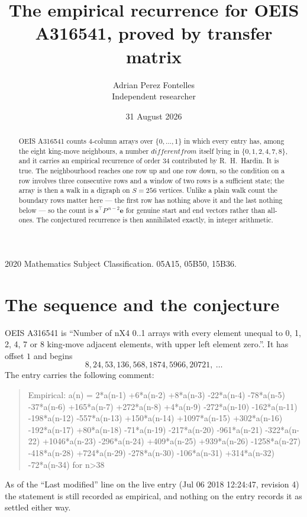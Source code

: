 \documentclass[11pt,a4paper]{article}
\title{The empirical recurrence for OEIS A316541, proved by transfer matrix}
\author{Adrian Perez Fontelles\\ \small Independent researcher}
\date{31 August 2026}
\theoremstyle{plain}
\theoremstyle{definition}
\begin{document}
\maketitle

\begin{abstract}
OEIS A316541 counts $4$-column arrays over $\{0,\dots,1\}$ in which every entry has,
among the eight king-move neighbours, a number $different from$ itself lying in $\{0,1,2,4,7,8\}$, and it carries an empirical
recurrence of order $34$ contributed by R.~H.~Hardin. It is true. The neighbourhood
reaches one row up and one row down, so the condition on a row involves three consecutive
rows and a window of two rows is a sufficient state; the array is then a walk in a digraph
on $S=256$ vertices. Unlike a plain walk count the boundary rows matter here --- the first
row has nothing above it and the last nothing below --- so the count is
$\mathbf{s}^{\!\top}P^{\,n-2}\mathbf{e}$ for genuine start and end vectors rather than
all-ones. The conjectured recurrence is then annihilated exactly, in integer arithmetic.
\end{abstract}

\noindent\small 2020 Mathematics Subject Classification. 05A15, 05B50, 15B36.\normalsize

\section{The sequence and the conjecture}

OEIS A316541 is ``Number of nX4 0..1 arrays with every element unequal to 0, 1, 2, 4, 7 or 8 king-move adjacent elements, with upper left element zero.''. It has offset
$1$ and begins
\[
8, 24, 53, 136, 568, 1874, 5966, 20721,\ \dots
\]
The entry carries the following comment:
\begin{quote}\small
Empirical: a(n) = 2*a(n-1) +6*a(n-2) +8*a(n-3) -22*a(n-4) -78*a(n-5) -37*a(n-6) +165*a(n-7) +272*a(n-8) +4*a(n-9) -272*a(n-10) -162*a(n-11) -198*a(n-12) -557*a(n-13) +150*a(n-14) +1097*a(n-15) +302*a(n-16) -192*a(n-17) +80*a(n-18) -71*a(n-19) -217*a(n-20) -961*a(n-21) -322*a(n-22) +1046*a(n-23) -296*a(n-24) +409*a(n-25) +939*a(n-26) -1258*a(n-27) -418*a(n-28) +724*a(n-29) -278*a(n-30) -106*a(n-31) +314*a(n-32) -72*a(n-34) for n>38
\end{quote}
As of the ``Last modified'' line on the live entry (Jul 06 2018 12:24:47, revision
4) the statement is still recorded as empirical, and nothing on the entry
records it as settled either way.
\end{document}
